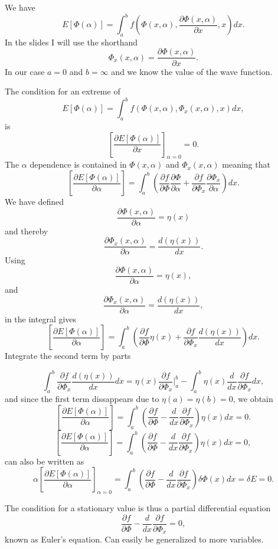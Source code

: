 We have
\[ E[\Phi(\alpha)]= \int_a^b f(\Phi(x,\alpha),\frac{\partial \Phi(x,\alpha)}{\partial x},x)dx.\] 
In the slides I will use  the shorthand
\[
\Phi_x(x,\alpha) = \frac{\partial \Phi(x,\alpha)}{\partial x}.
\]
In our case $a=0$ and $b=\infty$ and we know the value of the wave function.

The condition for an extreme of
\[ E[\Phi(\alpha)]= \int_a^b f(\Phi(x,\alpha),\Phi_x(x,\alpha),x)dx,\]
is
\[
\left[\frac{\partial  E[\Phi(\alpha)]}{\partial x}\right]_{\alpha=0} =0.\]
The $\alpha$ dependence is contained in $\Phi(x,\alpha)$ and $\Phi_x(x,\alpha)$ meaning that
\[
\left[\frac{\partial  E[\Phi(\alpha)]}{\partial \alpha}\right]=\int_a^b \left( \frac{\partial f}{\partial \Phi}\frac{\partial \Phi}{\partial \alpha}+\frac{\partial f}{\partial \Phi_x}\frac{\partial \Phi_x}{\partial \alpha}        \right)dx.\]
We have defined 
\[
\frac{\partial \Phi(x,\alpha)}{\partial \alpha}=\eta(x)
\]
and thereby 
\[
\frac{\partial \Phi_x(x,\alpha)}{\partial \alpha}=\frac{d(\eta(x))}{dx}.
\]
Using
\[
\frac{\partial \Phi(x,\alpha)}{\partial \alpha}=\eta(x),
\]
and 
\[
\frac{\partial \Phi_x(x,\alpha)}{\partial \alpha}=\frac{d(\eta(x))}{dx},
\]
in the integral gives 
\[
\left[\frac{\partial  E[\Phi(\alpha)]}{\partial \alpha}\right]=\int_a^b \left( \frac{\partial f}{\partial \Phi}\eta(x)+\frac{\partial f}{\partial \Phi_x}\frac{d(\eta(x))}{dx}        \right)dx.\]
Integrate the second term by parts

\[
\int_a^b \frac{\partial f}{\partial \Phi_x}\frac{d(\eta(x))}{dx}dx =\eta(x)\frac{\partial f}{\partial \Phi_x}|_a^b-
\int_a^b \eta(x)\frac{d}{dx}\frac{\partial f}{\partial \Phi_x}dx, 
\]
and since the first term dissappears due to $\eta(a)=\eta(b)=0$, we obtain
\[
\left[\frac{\partial  E[\Phi(\alpha)]}{\partial \alpha}\right]=\int_a^b \left( \frac{\partial f}{\partial \Phi}-\frac{d}{dx}\frac{\partial f}{\partial \Phi_x}
\right)\eta(x)dx=0.\]
\[
\left[\frac{\partial  E[\Phi(\alpha)]}{\partial \alpha}\right]=\int_a^b \left( \frac{\partial f}{\partial \Phi}-\frac{d}{dx}\frac{\partial f}{\partial \Phi_x}
\right)\eta(x)dx=0,\]
can also be written as 
\[
\alpha\left[\frac{\partial  E[\Phi(\alpha)]}{\partial \alpha}\right]_{\alpha=0}=\int_a^b \left( \frac{\partial f}{\partial \Phi}-\frac{d}{dx}\frac{\partial f}{\partial \Phi_x}
\right)\delta\Phi(x)dx=\delta E = 0.\]

The condition for a stationary value is thus a partial differential equation
\[
\frac{\partial f}{\partial \Phi}-\frac{d}{dx}\frac{\partial f}{\partial \Phi_x}=0,\]
known as Euler's equation.
Can easily be generalized to more variables.


